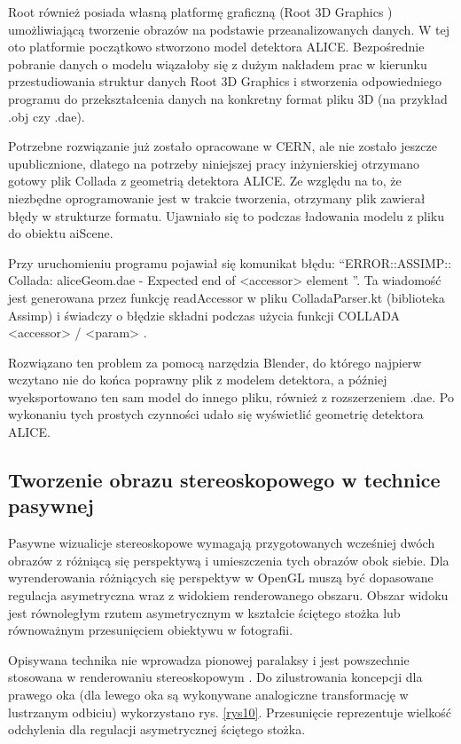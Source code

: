 Root również posiada własną platformę graficzną (Root 3D Graphics \cite{root3dGraphics}) umożliwiającą tworzenie obrazów na podstawie przeanalizowanych danych. W tej oto platformie początkowo stworzono model detektora ALICE. Bezpośrednie pobranie danych o modelu wiązałoby się z dużym nakładem prac w kierunku przestudiowania struktur danych Root 3D Graphics i stworzenia odpowiedniego programu do przekształcenia danych na konkretny format pliku 3D (na przykład .obj czy .dae). 

Potrzebne rozwiązanie już zostało opracowane w CERN, ale nie zostało jeszcze upublicznione, dlatego na potrzeby niniejszej pracy inżynierskiej otrzymano gotowy plik Collada z geometrią detektora ALICE. Ze względu na to, że niezbędne oprogramowanie jest w trakcie tworzenia, otrzymany plik zawierał błędy w strukturze formatu. Ujawniało się to podczas ładowania modelu z pliku do obiektu aiScene. 

Przy uruchomieniu programu pojawiał się komunikat błędu: \textquotedblleft ERROR::ASSIMP:: Collada: aliceGeom.dae - Expected end of <accessor> element \textquotedblright . Ta wiadomość jest generowana przez funkcję readAccessor w pliku ColladaParser.kt (biblioteka Assimp) i świadczy o błędzie składni podczas użycia funkcji COLLADA <accessor> / <param> \cite{collada}.

Rozwiązano ten problem za pomocą narzędzia Blender, do którego najpierw wczytano nie do końca poprawny plik z modelem detektora, a później wyeksportowano ten sam model do innego pliku, również z rozszerzeniem .dae. Po wykonaniu tych prostych czynności udało się wyświetlić geometrię detektora ALICE. 
\newpage
\subsection{Tworzenie obrazu stereoskopowego w technice pasywnej}
Pasywne wizualicje stereoskopowe wymagają przygotowanych wcześniej dwóch obrazów z różniącą się perspektywą i umieszczenia tych obrazów obok siebie. Dla wyrenderowania różniących się perspektyw w OpenGL muszą być dopasowane regulacja asymetryczna wraz z widokiem renderowanego obszaru. Obszar widoku jest równoległym rzutem asymetrycznym w kształcie ściętego stożka lub równoważnym przesunięciem obiektywu w fotografii. 

Opisywana technika nie wprowadza pionowej paralaksy i jest powszechnie stosowana w renderowaniu stereoskopowym \cite{openglCookbook}. Do zilustrowania koncepcji dla prawego oka (dla lewego oka są wykonywane analogiczne transformację w lustrzanym odbiciu) wykorzystano rys. \ref{rys10}. Przesunięcie reprezentuje wielkość odchylenia dla regulacji asymetrycznej ściętego stożka.

